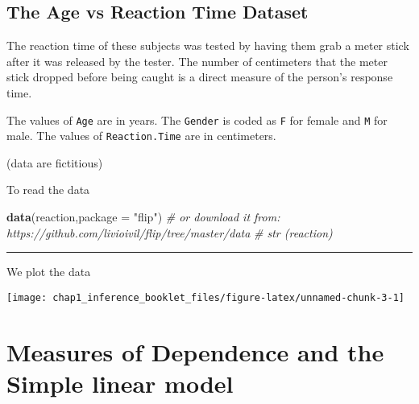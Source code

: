 \documentclass[]{article}
\newenvironment{Shaded}{\begin{snugshade}}{\end{snugshade}}
\newcommand{\KeywordTok}[1]{\textcolor[rgb]{0.13,0.29,0.53}{\textbf{#1}}}
\newcommand{\DataTypeTok}[1]{\textcolor[rgb]{0.13,0.29,0.53}{#1}}
\newcommand{\DecValTok}[1]{\textcolor[rgb]{0.00,0.00,0.81}{#1}}
\newcommand{\StringTok}[1]{\textcolor[rgb]{0.31,0.60,0.02}{#1}}
\newcommand{\CommentTok}[1]{\textcolor[rgb]{0.56,0.35,0.01}{\textit{#1}}}
\newcommand{\OperatorTok}[1]{\textcolor[rgb]{0.81,0.36,0.00}{\textbf{#1}}}
\newcommand{\NormalTok}[1]{#1}
\begin{document}
\subsection{The Age vs Reaction Time
Dataset}\label{the-age-vs-reaction-time-dataset}

The reaction time of these subjects was tested by having them grab a
meter stick after it was released by the tester. The number of
centimeters that the meter stick dropped before being caught is a direct
measure of the person's response time.

The values of \texttt{Age} are in years. The \texttt{Gender} is coded as
\texttt{F} for female and \texttt{M} for male. The values of
\texttt{Reaction.Time} are in centimeters.

(data are fictitious)

To read the data

\begin{Shaded}
\begin{Highlighting}[]
\KeywordTok{data}\NormalTok{(reaction,}\DataTypeTok{package =} \StringTok{"flip"}\NormalTok{)}
\CommentTok{# or download it from: https://github.com/livioivil/flip/tree/master/data}
\CommentTok{# str (reaction)}
\end{Highlighting}
\end{Shaded}

\begin{center}\rule{0.5\linewidth}{\linethickness}\end{center}

We plot the data

\begin{Shaded}
\end{Shaded}

\begin{center}\texttt{[image: chap1\_inference\_booklet\_files/figure-latex/unnamed-chunk-3-1]} \end{center}

\section{Measures of Dependence and the Simple linear
model}\label{measures-of-dependence-and-the-simple-linear-model}
\end{document}
